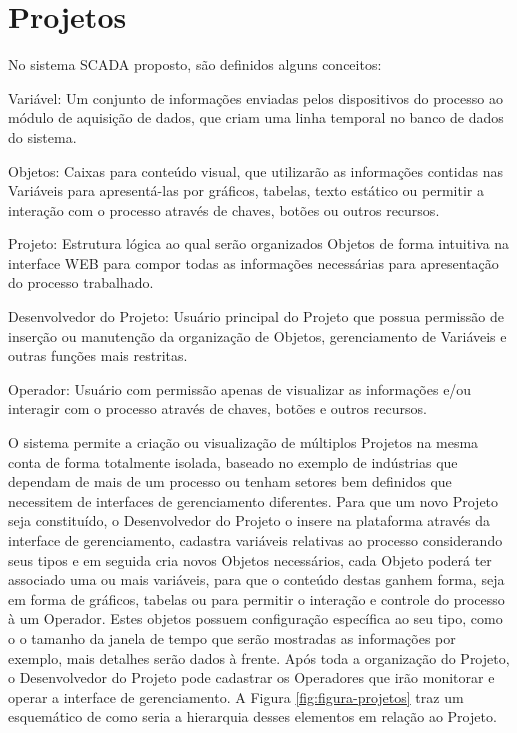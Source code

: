 \section{Projetos}
\label{sec:projetos}
No sistema \gls{SCADA} proposto, são definidos alguns conceitos:

\begin{alineascomponto}
    \item Variável: Um conjunto de informações enviadas pelos dispositivos do processo ao módulo de aquisição de dados, que criam uma linha temporal no banco de dados do sistema.
    \item Objetos: Caixas para conteúdo visual, que utilizarão as informações contidas nas Variáveis para apresentá-las por gráficos, tabelas, texto estático ou permitir a interação com o processo através de chaves, botões ou outros recursos.
    \item Projeto: Estrutura lógica ao qual serão organizados Objetos de forma intuitiva na interface \gls{WEB} para compor todas as informações necessárias para apresentação do processo trabalhado.
    \item Desenvolvedor do Projeto: Usuário principal do Projeto que possua permissão de inserção ou manutenção da organização de Objetos, gerenciamento de Variáveis e outras funções mais restritas.
    \item Operador: Usuário com permissão apenas de visualizar as informações e/ou interagir com o processo através de chaves, botões e outros recursos.
\end{alineascomponto}

O sistema permite a criação ou visualização de múltiplos Projetos na mesma conta de forma totalmente isolada, baseado no exemplo de indústrias que dependam de mais de um processo ou tenham setores bem definidos que necessitem de interfaces de gerenciamento diferentes. Para que um novo Projeto seja constituído, o Desenvolvedor do Projeto o insere na plataforma através da interface de gerenciamento, cadastra variáveis relativas ao processo considerando seus tipos e em seguida cria novos Objetos necessários, cada Objeto poderá ter associado uma ou mais variáveis, para que o conteúdo destas ganhem forma, seja em forma de gráficos, tabelas ou para permitir o interação e controle do processo à um Operador. Estes objetos possuem configuração específica ao seu tipo, como o o tamanho da janela de tempo que serão mostradas as informações por exemplo, mais detalhes serão dados à frente. Após toda a organização do Projeto, o Desenvolvedor do Projeto pode cadastrar os Operadores que irão monitorar e operar a interface de gerenciamento. A Figura \ref{fig:figura-projetos} traz um esquemático de como seria a hierarquia desses elementos em relação ao Projeto. 


